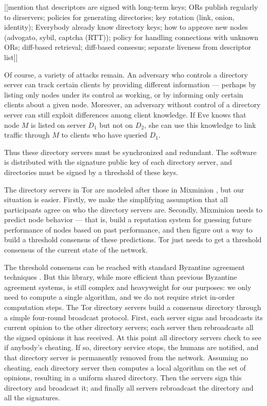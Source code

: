 \documentclass[times,10pt,twocolumn]{article}
\begin{document}
[[mention that descriptors are signed with long-term keys; ORs publish
    regularly to dirservers; policies for generating directories; key
    rotation (link, onion, identity); Everybody already know directory
    keys; how to approve new nodes (advogato, sybil, captcha (RTT));
    policy for handling connections with unknown ORs; diff-based
    retrieval; diff-based consesus; separate liveness from descriptor
    list]]

Of course, a variety of attacks remain. An adversary who controls a
directory server can track certain clients by providing different
information --- perhaps by listing only nodes under its control
as working, or by informing only certain clients about a given
node. Moreover, an adversary without control of a directory server can
still exploit differences among client knowledge. If Eve knows that
node $M$ is listed on server $D_1$ but not on $D_2$, she can use this
knowledge to link traffic through $M$ to clients who have queried $D_1$.

Thus these directory servers must be synchronized and redundant. The
software is distributed with the signature public key of each directory
server, and directories must be signed by a threshold of these keys.

The directory servers in Tor are modeled after those in Mixminion
\cite{minion-design}, but our situation is easier. Firstly, we make the
simplifying assumption that all participants agree on who the directory
servers are. Secondly, Mixminion needs to predict node behavior ---
that is, build a reputation system for guessing future performance of
nodes based on past performance, and then figure out a way to build
a threshold consensus of these predictions. Tor just needs to get a
threshold consensus of the current state of the network.

The threshold consensus can be reached with standard Byzantine agreement
techniques \cite{castro-liskov}.
But this library, while more efficient than previous Byzantine agreement
systems, is still complex and heavyweight for our purposes: we only need
to compute a single algorithm, and we do not require strict in-order
computation steps. The Tor directory servers build a consensus directory
through a simple four-round broadcast protocol. First, each server signs
and broadcasts its current opinion to the other directory servers; each
server then rebroadcasts all the signed opinions it has received. At this
point all directory servers check to see if anybody's cheating. If so,
directory service stops, the humans are notified, and that directory
server is permanently removed from the network. Assuming no cheating,
each directory server then computes a local algorithm on the set of
opinions, resulting in a uniform shared directory. Then the servers sign
this directory and broadcast it; and finally all servers rebroadcast
the directory and all the signatures.
\end{document}
